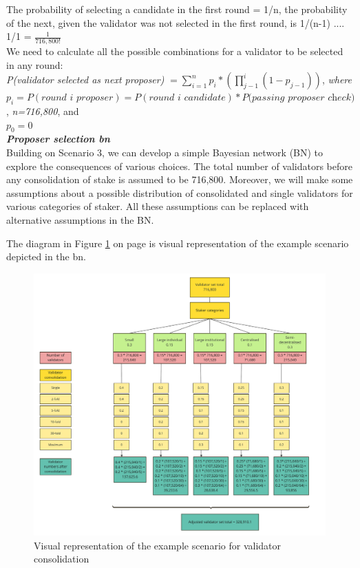 The probability of selecting a candidate in the first round = 1/n, the probability of the next, given the validator was not selected in the first round, is 1/(n-1) .... 1/1 = $ \frac{1}{716,800!}$ \\
We need to calculate all the possible combinations for a validator to be selected in any round: \\

\noindent
\textit{P(validator selected as next proposer) }$= \sum^{n}_{i=1} p_i * (\prod_{j-1}^{i}(1-p_{j-1})) $, \textit{ where}\\
$p_i = P(\textit{round i proposer}) = P(\textit{round i candidate}) * P(\textit{passing proposer check)}$,
\textit{n=716,800}, and\\
$p_0 = 0$ \\

\noindent
\textbf{\textit{Proposer selection \gls{bn}}} \\
\noindent
Building on Scenario 3, we can develop a simple Bayesian network (BN)  to explore the consequences of various choices. The total number of validators before any consolidation of stake is assumed to be 716,800.  Moreover, we will make some assumptions about a possible distribution of consolidated and single validators for various categories of staker. All these assumptions can be replaced with alternative assumptions in the BN. 

The diagram in Figure \ref{fig:proposer} on page \pageref{fig:proposer} is visual representation of the example scenario depicted in the \gls{bn}.

\begin{figure}[htbp]
\begin{center}
\includegraphics[width=\linewidth]{images/proposer-selection-diagram.pdf}
\caption{Visual representation of the example scenario for validator consolidation}
\label{fig:proposer}
\end{center}
\end{figure}


